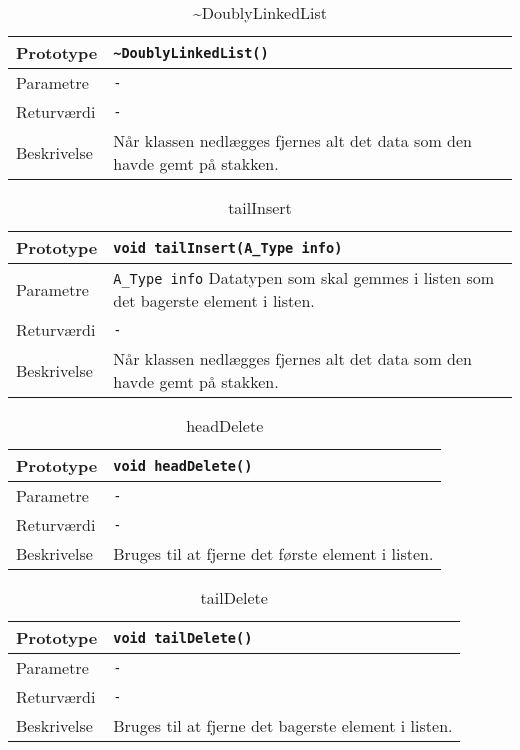 \begin{table}[h]
\begin{tabularx}{\textwidth}{| >{\raggedright\arraybackslash}p{2.5 cm} | >{\raggedright\arraybackslash}X |} \hline
Prototype & \texttt{\textasciitilde DoublyLinkedList()} \\\hline
Parametre & \texttt{-}\\\hline
Returværdi & \texttt{-}\\\hline
Beskrivelse & Når klassen nedlægges fjernes alt det data som den havde gemt på stakken. \\\hline
\end{tabularx}
\caption{\textasciitilde DoublyLinkedList}
\label{table:DoublyLinkedList_destructor}
\end{table}


\begin{table}[h]
\begin{tabularx}{\textwidth}{| >{\raggedright\arraybackslash}p{2.5 cm} | >{\raggedright\arraybackslash}X |} \hline
Prototype & \texttt{void tailInsert(A\_Type info)} \\\hline
Parametre & \texttt{A\_Type info} \newline
Datatypen som skal gemmes i listen som det bagerste element i listen. \\\hline
Returværdi & \texttt{-} \\\hline
Beskrivelse & Når klassen nedlægges fjernes alt det data som den havde gemt på stakken. \\\hline
\end{tabularx}
\caption{tailInsert}
\label{table:tailInsert}
\end{table}


\begin{table}[h]
\begin{tabularx}{\textwidth}{| >{\raggedright\arraybackslash}p{2.5 cm} | >{\raggedright\arraybackslash}X |} \hline
Prototype & \texttt{void headDelete()} \\\hline
Parametre & \texttt{-} \\\hline
Returværdi & \texttt{-} \\\hline
Beskrivelse & Bruges til at fjerne det første element i listen. \\\hline
\end{tabularx}
\caption{headDelete}
\label{table:headDelete}
\end{table}


\begin{table}[h]
\begin{tabularx}{\textwidth}{| >{\raggedright\arraybackslash}p{2.5 cm} | >{\raggedright\arraybackslash}X |} \hline
Prototype & \texttt{void tailDelete()} \\\hline
Parametre & \texttt{-} \\\hline
Returværdi & \texttt{-} \\\hline
Beskrivelse & Bruges til at fjerne det bagerste element i listen. \\\hline
\end{tabularx}
\caption{tailDelete}
\label{table:tailDelete}
\end{table}


